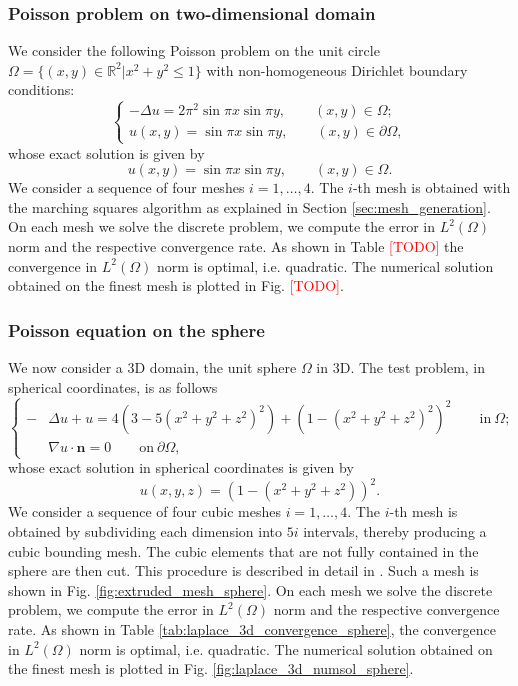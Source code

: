 \documentclass[a4paper]{article}
\newcommand{\boldn}{\boldsymbol{n}}
\newcommand{\red}[1]{\textcolor{red}{#1}}
\begin{document}
\subsubsection{Poisson problem on two-dimensional domain}
\label{sec:laplace_twodim}
We consider the following Poisson problem on the unit circle $\Omega = \{(x,y)\in\mathbb{R}^2 | x^2 + y^2 \leq 1\}$ with non-homogeneous Dirichlet boundary conditions:
\begin{equation}
\begin{cases}
-\Delta u = 2\pi^2 \sin \pi x \sin \pi y, \qquad (x,y) \in \Omega;\\
u(x,y) = \sin\pi x\sin\pi y, \qquad (x,y) \in  \partial \Omega,
\end{cases}
\end{equation}
whose exact solution is given by
\begin{equation}
u(x,y) = \sin \pi x \sin \pi y, \qquad (x,y) \in \Omega.
\end{equation}
We consider a sequence of four meshes $i=1,\dots,4$. The $i$-th mesh is obtained with the marching squares algorithm as explained in Section \ref{sec:mesh_generation}. On each mesh we solve the discrete problem,  we compute the error in $L^2(\Omega)$ norm and the respective convergence rate.  As shown in Table \red{[TODO]} the convergence in $L^2(\Omega)$ norm is optimal, i.e. quadratic. The numerical solution obtained on the finest mesh is plotted in Fig.  \red{[TODO]}.

 
\subsubsection{Poisson equation on the sphere}
\label{sec:laplace_sphere}
We now consider a 3D domain, the unit sphere $\Omega$ in 3D. The test problem, in spherical coordinates, is as follows
\begin{equation}
\label{experiment_laplace_equation_3d_sphere}
\begin{cases}
-&\Delta u + u = 4(3-5(x^2 + y^2 + z^2)^2) + (1-(x^2 + y^2 + z^2)^2)^2 \qquad \text{in}\ \Omega;\\
&\nabla u \cdot \boldn = 0 \qquad \text{on}\ \partial \Omega,
\end{cases}
\end{equation}
whose exact solution in spherical coordinates is given by
\begin{equation}
u(x,y,z) = (1-(x^2 + y^2 + z^2))^2.
\end{equation}
We consider a sequence of four cubic meshes $i=1,\dots,4$. The $i$-th mesh is obtained by subdividing each dimension into $5i$ intervals, thereby producing a cubic bounding mesh.  The cubic elements that are not fully contained in the sphere are then cut.  This procedure is described in detail in \cite{frittelli2023elliptic}.  Such a mesh is shown in Fig.  \ref{fig:extruded_mesh_sphere}. On each mesh we solve the discrete problem,  we compute the error in $L^2(\Omega)$ norm and the respective convergence rate. As shown in Table \ref{tab:laplace_3d_convergence_sphere}, the convergence in $L^2(\Omega)$ norm is optimal, i.e. quadratic. The numerical solution obtained on the finest mesh is plotted in Fig.  \ref{fig:laplace_3d_numsol_sphere}.
\end{document}
